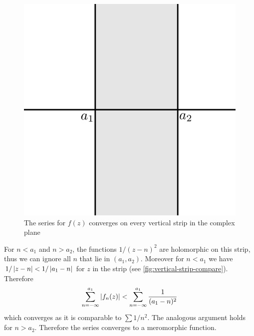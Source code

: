 \begin{figure}[ht]
    \centering
    \includegraphics[scale=0.65]{Images/vertical_strip_cvgnc.png}
    \caption{The series for $f(z)$ converges on every vertical strip in the complex plane}
    \label{fig:vertical-strip-cvgnc}
\end{figure}


For $n < a_1$ and $n > a_2$, the functions $1/(z - n)^2$ are holomorphic on this strip, thus we can ignore all $n$ that lie in $(a_1, a_2)$. Moreover for $n < a_1$ we have $1/\left|z - n\right| < 1/\left|a_1 - n\right|$ for $z$ in the strip (see \autoref{fig:vertical-strip-compare}). Therefore 
$$ \sum_{n = -\infty}^{a_1} \left|f_n(z)\right| < \sum_{n = -\infty}^{a_1} \frac{1}{(a_1 - n)^2} $$
which converges as it is comparable to $\sum 1/n^2$. The analogous argument holds for $n > a_2$. Therefore the series converges to a meromorphic function.

